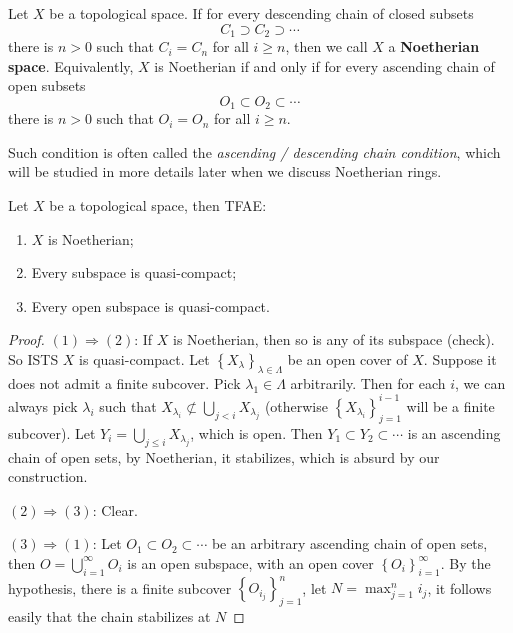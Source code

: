 \documentclass{note-eng}
\begin{document}
\begin{definition}
    Let $X$ be a topological space. If for every descending chain of closed subsets
    $$C_1 \supset C_2 \supset \cdots$$
    there is $n \gt 0$ such that $C_i = C_n$ for all $i \ge n$, then we call $X$ a \textbf{Noetherian space}. Equivalently, $X$ is Noetherian if and only if for every ascending chain of open subsets
    $$O_1 \subset O_2 \subset \cdots$$
    there is $n \gt 0$ such that $O_i = O_n$ for all $i \ge n$.
\end{definition}

Such condition is often called the \textit{ascending / descending chain condition}, which will be studied in more details later when we discuss Noetherian rings.

\begin{proposition}\label{prop:equi-def-Noetherian}
    Let $X$ be a topological space, then TFAE:
    \begin{enumerate}
        \item $X$ is Noetherian;
        \item Every subspace is quasi-compact;
        \item Every open subspace is quasi-compact.
    \end{enumerate}
\end{proposition}

\begin{proof}
    $(1) \Rightarrow (2)$: If $X$ is Noetherian, then so is any of its subspace (check). So ISTS $X$ is quasi-compact. Let $\left\lbrace X_\lambda \right\rbrace_{\lambda \in \Lambda}$ be an open cover of $X$. Suppose it does not admit a finite subcover. Pick $\lambda_1 \in \Lambda$ arbitrarily. Then for each $i$, we can always pick $\lambda_i$ such that $X_{\lambda_i} \not \subset \bigcup\limits_{j \lt i} X_{\lambda_j}$ (otherwise $\left\lbrace X_{\lambda_i} \right\rbrace_{j = 1}^{i - 1}$ will be a finite subcover). Let $Y_i = \bigcup\limits_{j \le i} X_{\lambda_j}$, which is open. Then $Y_1 \subset Y_2 \subset \cdots$ is an ascending chain of open sets, by Noetherian, it stabilizes, which is absurd by our construction.

    $(2) \Rightarrow (3)$: Clear.

    $(3) \Rightarrow (1)$: Let $O_1 \subset O_2 \subset \cdots$ be an arbitrary ascending chain of open sets, then $O = \bigcup\limits_{i = 1}^{\infty} O_i$ is an open subspace, with an open cover $\left\lbrace O_i \right\rbrace_{i = 1}^{\infty}$. By the hypothesis, there is a finite subcover $\left\lbrace O_{i_j} \right\rbrace_{j = 1}^n$, let $N = \max_{j = 1}^n i_j$, it follows easily that the chain stabilizes at $N$
\end{proof}
\end{document}
